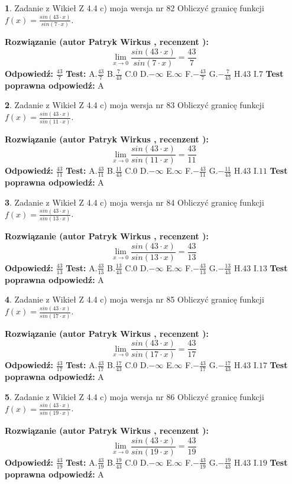 \documentclass[12pt, a4paper]{article}
\theoremstyle{definition} %
\newtheorem{zad}{}
\newcommand{\zadStart}[1]{\begin{zad}#1\newline}
\newcommand{\zadStop}{\end{zad}}
\newcommand{\rozwStart}[2]{\noindent \textbf{Rozwiązanie (autor #1 , recenzent #2): }\newline}
\newcommand{\rozwStop}{\newline}
\newcommand{\odpStart}{\noindent \textbf{Odpowiedź:}\newline}
\newcommand{\odpStop}{\newline}
\newcommand{\testStart}{\noindent \textbf{Test:}\newline}
\newcommand{\testStop}{\newline}
\newcommand{\kluczStart}{\noindent \textbf{Test poprawna odpowiedź:}\newline}
\newcommand{\kluczStop}{\newline}
\begin{document}
\zadStart{Zadanie z Wikieł Z 4.4 c) moja wersja nr 82}
Obliczyć granicę funkcji $f(x)=\frac{sin(43\cdot x)}{sin(7\cdot x)}$.
\zadStop
\rozwStart{Patryk Wirkus}{}
$$\lim\limits_{x\to 0}\frac{sin(43\cdot x)}{sin(7\cdot x)}=
\frac{43}{7}$$
\rozwStop
\odpStart
$\frac{43}{7}$
\odpStop
\testStart
A.$\frac{43}{7}$
B.$\frac{7}{43}$
C.$0$
D.$-\infty$
E.$\infty$
F.$-\frac{43}{7}$
G.$-\frac{7}{43}$
H.$43$
I.$7$
\testStop
\kluczStart
A
\kluczStop



\zadStart{Zadanie z Wikieł Z 4.4 c) moja wersja nr 83}
Obliczyć granicę funkcji $f(x)=\frac{sin(43\cdot x)}{sin(11\cdot x)}$.
\zadStop
\rozwStart{Patryk Wirkus}{}
$$\lim\limits_{x\to 0}\frac{sin(43\cdot x)}{sin(11\cdot x)}=
\frac{43}{11}$$
\rozwStop
\odpStart
$\frac{43}{11}$
\odpStop
\testStart
A.$\frac{43}{11}$
B.$\frac{11}{43}$
C.$0$
D.$-\infty$
E.$\infty$
F.$-\frac{43}{11}$
G.$-\frac{11}{43}$
H.$43$
I.$11$
\testStop
\kluczStart
A
\kluczStop



\zadStart{Zadanie z Wikieł Z 4.4 c) moja wersja nr 84}
Obliczyć granicę funkcji $f(x)=\frac{sin(43\cdot x)}{sin(13\cdot x)}$.
\zadStop
\rozwStart{Patryk Wirkus}{}
$$\lim\limits_{x\to 0}\frac{sin(43\cdot x)}{sin(13\cdot x)}=
\frac{43}{13}$$
\rozwStop
\odpStart
$\frac{43}{13}$
\odpStop
\testStart
A.$\frac{43}{13}$
B.$\frac{13}{43}$
C.$0$
D.$-\infty$
E.$\infty$
F.$-\frac{43}{13}$
G.$-\frac{13}{43}$
H.$43$
I.$13$
\testStop
\kluczStart
A
\kluczStop



\zadStart{Zadanie z Wikieł Z 4.4 c) moja wersja nr 85}
Obliczyć granicę funkcji $f(x)=\frac{sin(43\cdot x)}{sin(17\cdot x)}$.
\zadStop
\rozwStart{Patryk Wirkus}{}
$$\lim\limits_{x\to 0}\frac{sin(43\cdot x)}{sin(17\cdot x)}=
\frac{43}{17}$$
\rozwStop
\odpStart
$\frac{43}{17}$
\odpStop
\testStart
A.$\frac{43}{17}$
B.$\frac{17}{43}$
C.$0$
D.$-\infty$
E.$\infty$
F.$-\frac{43}{17}$
G.$-\frac{17}{43}$
H.$43$
I.$17$
\testStop
\kluczStart
A
\kluczStop



\zadStart{Zadanie z Wikieł Z 4.4 c) moja wersja nr 86}
Obliczyć granicę funkcji $f(x)=\frac{sin(43\cdot x)}{sin(19\cdot x)}$.
\zadStop
\rozwStart{Patryk Wirkus}{}
$$\lim\limits_{x\to 0}\frac{sin(43\cdot x)}{sin(19\cdot x)}=
\frac{43}{19}$$
\rozwStop
\odpStart
$\frac{43}{19}$
\odpStop
\testStart
A.$\frac{43}{19}$
B.$\frac{19}{43}$
C.$0$
D.$-\infty$
E.$\infty$
F.$-\frac{43}{19}$
G.$-\frac{19}{43}$
H.$43$
I.$19$
\testStop
\kluczStart
A
\kluczStop
\end{document}
